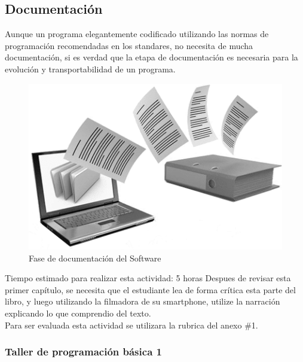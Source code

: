 \documentclass[a4paper,12pt,spanish]{article}
\begin{document}
\subsection{Documentación}
\label{sec:la-etapa-de-4}
Aunque un programa elegantemente codificado utilizando las normas de
programación recomendadas en los standares, no necesita de mucha
documentación, si es verdad que la etapa de documentación es necesaria
para la evolución y transportabilidad de un programa.

\begin{figure}[H]
  \centering
  \includegraphics[scale=0.3]{documentacion}
  \caption{Fase de documentación del Software}
  \label{fig:documentacion}
\end{figure}


\begin{tcolorbox}[skin=widget,
boxrule=1mm,
coltitle=black,
colframe=blue!45!white,
colback=blue!15!white,
width=(1\linewidth),before=\hfill,after=\hfill,
adjusted title={{\Large Actividad B1}:\textbf{Lea criticamente y luego narre en un video lo que comprendio}}]
Tiempo estimado para realizar esta actividad: 5 horas
\tcblower
Despues de revisar esta primer capítulo, se necesita que el estudiante lea de forma crítica esta parte del libro, y luego utilizando la filmadora de su smartphone, utilize la narración explicando lo que comprendio del texto.\\

Para ser evaluada esta actividad se utilizara la rubrica del anexo \#1.


\end{tcolorbox}



\subsubsection{Taller de programación básica 1}
\label{sec:tall-de-progr}
\end{document}

